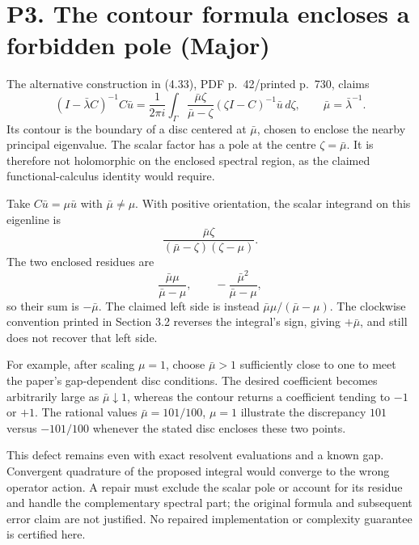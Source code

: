 \documentclass[10pt]{article}
\begin{document}
\section*{P3. The contour formula encloses a forbidden pole (Major)}
The alternative construction in (4.33), PDF p. 42/printed p. 730, claims \[(I-\bar\lambda C)^{-1}C\bar u
=\frac1{2\pi i}\int_\Gamma
  \frac{\bar\mu\zeta}{\bar\mu-\zeta}
  (\zeta I-C)^{-1}\bar u\,d\zeta,
\qquad \bar\mu=\bar\lambda^{-1}.\] Its contour is the boundary of a disc centered at \(\bar\mu\), chosen to enclose the nearby principal eigenvalue. The scalar factor has a pole at the centre \(\zeta=\bar\mu\). It is therefore not holomorphic on the enclosed spectral region, as the claimed functional-calculus identity would require.\par
Take \(C\bar u=\mu\bar u\) with \(\bar\mu\ne\mu\). With positive orientation, the scalar integrand on this eigenline is \[\frac{\bar\mu\zeta}{(\bar\mu-\zeta)(\zeta-\mu)}.\] The two enclosed residues are \[\frac{\bar\mu\mu}{\bar\mu-\mu},
\qquad
-\frac{\bar\mu^2}{\bar\mu-\mu},\] so their sum is \(-\bar\mu\). The claimed left side is instead \(\bar\mu\mu/(\bar\mu-\mu)\). The clockwise convention printed in Section 3.2 reverses the integral’s sign, giving \(+\bar\mu\), and still does not recover that left side.\par
For example, after scaling \(\mu=1\), choose \(\bar\mu>1\) sufficiently close to one to meet the paper’s gap-dependent disc conditions. The desired coefficient becomes arbitrarily large as \(\bar\mu\downarrow1\), whereas the contour returns a coefficient tending to \(-1\) or \(+1\). The rational values \(\bar\mu=101/100\), \(\mu=1\) illustrate the discrepancy \(101\) versus \(-101/100\) whenever the stated disc encloses these two points.\par
This defect remains even with exact resolvent evaluations and a known gap. Convergent quadrature of the proposed integral would converge to the wrong operator action. A repair must exclude the scalar pole or account for its residue and handle the complementary spectral part; the original formula and subsequent error claim are not justified. No repaired implementation or complexity guarantee is certified here.\par
\end{document}
